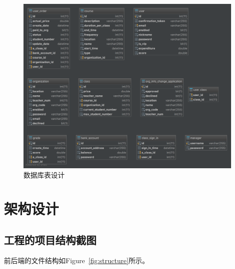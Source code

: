 \documentclass[11pt]{article}
\begin{document}
\begin{figure}[h]
  	\includegraphics[width=\linewidth]{img/oleducation-tables.png}
  	\caption{数据库表设计}
  	\label{fig:database-tables}
\end{figure}


\section{架构设计}
\subsection{工程的项目结构截图}
前后端的文件结构如Figure~\ref{fig:structure}所示。
\end{document}
